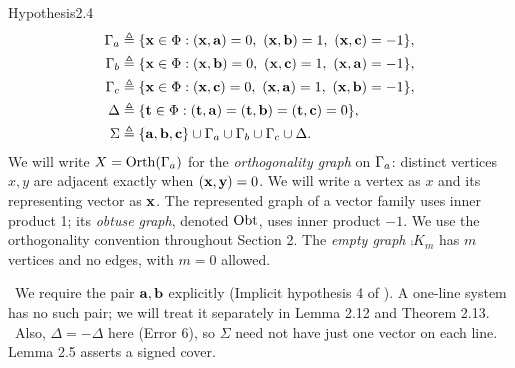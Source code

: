 \begin{cgss}{Hypothesis}{2.4}\label{hyp:2.4}
 \begin{align*}
 \Ga&\triangleq\{\Zx\in\Phi:(\Zx,\Za)=0,\ (\Zx,\Zb)=1,\ (\Zx,\Zc)=-1\},\\
 \Gb&\triangleq\{\Zx\in\Phi:(\Zx,\Zb)=0,\ (\Zx,\Zc)=1,\ (\Zx,\Za)=-1\},\\
 \Gc&\triangleq\{\Zx\in\Phi:(\Zx,\Zc)=0,\ (\Zx,\Za)=1,\ (\Zx,\Zb)=-1\},\\
 \Delta&\triangleq\{\Zt\in\Phi:(\Zt,\Za)=(\Zt,\Zb)=(\Zt,\Zc)=0\},\\
 \Sigma&\triangleq\{\Za,\Zb,\Zc\}\cup\Ga\cup\Gb\cup\Gc\cup\Delta.
 \end{align*}
 We will write $X=\mathop{\mathrm{Orth}}\nolimits(\Gamma_a)$ for the \emph{orthogonality graph} on $\Gamma_a$: distinct vertices
 $x,y$ are adjacent exactly when $({\mathbf x},{\mathbf y})=0$. We will write a vertex as $x$ and
 its representing vector as ${\mathbf x}$.
 \label{def:gamma-graph}
 The represented graph of a vector family uses inner product 1; its
 \emph{obtuse graph}, denoted $\mathop{\mathrm{Obt}}\nolimits$, uses inner product $-1$.
 We use the orthogonality convention throughout Section 2.
 The \emph{empty graph} $\comp{K_m}$ has $m$ vertices and no edges, with $m=0$ allowed.
\end{cgss}

\noindent\repair\ We require the pair ${\mathbf a},{\mathbf b}$ explicitly (Implicit hypothesis 4 of
). A one-line system has no such pair;
we will treat it separately in Lemma 2.12 and Theorem 2.13.
\repair\ Also, $\Delta=-\Delta$ here (Error 6), so
$\Sigma$ need not have just one vector on each line. Lemma 2.5 asserts a signed cover.


